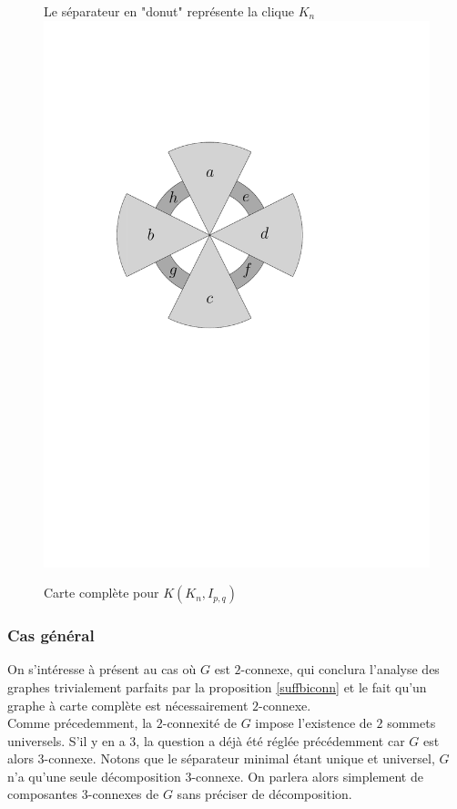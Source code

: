 \documentclass{scrartcl}
\begin{document}
\begin{flushleft}
\begin{figure}[h]
    \caption{Carte complète pour $K(K_n, I_{p,q})$}\label{KKnIpqmap}
    \begin{center}
        Le séparateur en "donut" représente la clique $K_n$\\
        \includegraphics[page=\ipeFigKKnIpqcompl, scale = 0.4]{figs}
    \end{center}
\end{figure}

\subsubsection{Cas général}

On s'intéresse à présent au cas où $G$ est $2$-connexe, qui conclura l'analyse des graphes trivialement parfaits par la proposition
\ref{suffbiconn} et le fait qu'un graphe à carte complète est nécessairement $2$-connexe.\\
Comme précedemment, la $2$-connexité de $G$ impose l'existence de $2$ sommets universels. S'il y en a $3$, la question
a déjà été réglée précédemment car $G$ est alors $3$-connexe. Notons que le séparateur minimal étant unique et universel,
$G$ n'a qu'une seule décomposition $3$-connexe. On parlera alors simplement de composantes $3$-connexes de $G$ sans préciser
de décomposition.


\end{flushleft}
\end{document}
